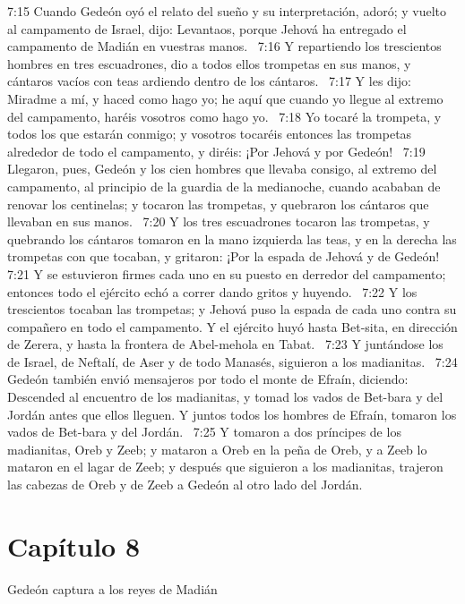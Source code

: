 7:15 Cuando Gedeón oyó el relato del sueño y su interpretación, adoró; y vuelto al campamento de Israel, dijo: Levantaos, porque Jehová ha entregado el campamento de Madián en vuestras manos.  
7:16 Y repartiendo los trescientos hombres en tres escuadrones, dio a todos ellos trompetas en sus manos, y cántaros vacíos con teas ardiendo dentro de los cántaros.  
7:17 Y les dijo: Miradme a mí, y haced como hago yo; he aquí que cuando yo llegue al extremo del campamento, haréis vosotros como hago yo.  
7:18 Yo tocaré la trompeta, y todos los que estarán conmigo; y vosotros tocaréis entonces las trompetas alrededor de todo el campamento, y diréis: ¡Por Jehová y por Gedeón!  
7:19 Llegaron, pues, Gedeón y los cien hombres que llevaba consigo, al extremo del campamento, al principio de la guardia de la medianoche, cuando acababan de renovar los centinelas; y tocaron las trompetas, y quebraron los cántaros que llevaban en sus manos.  
7:20 Y los tres escuadrones tocaron las trompetas, y quebrando los cántaros tomaron en la mano izquierda las teas, y en la derecha las trompetas con que tocaban, y gritaron: ¡Por la espada de Jehová y de Gedeón!  
7:21 Y se estuvieron firmes cada uno en su puesto en derredor del campamento; entonces todo el ejército echó a correr dando gritos y huyendo.  
7:22 Y los trescientos tocaban las trompetas; y Jehová puso la espada de cada uno contra su compañero en todo el campamento. Y el ejército huyó hasta Bet-sita, en dirección de Zerera, y hasta la frontera de Abel-mehola en Tabat.  
7:23 Y juntándose los de Israel, de Neftalí, de Aser y de todo Manasés, siguieron a los madianitas.  
7:24 Gedeón también envió mensajeros por todo el monte de Efraín, diciendo: Descended al encuentro de los madianitas, y tomad los vados de Bet-bara y del Jordán antes que ellos lleguen. Y juntos todos los hombres de Efraín, tomaron los vados de Bet-bara y del Jordán.  
7:25 Y tomaron a dos príncipes de los madianitas, Oreb y Zeeb; y mataron a Oreb en la peña de Oreb, y a Zeeb lo mataron en el lagar de Zeeb; y después que siguieron a los madianitas, trajeron las cabezas de Oreb y de Zeeb a Gedeón al otro lado del Jordán.  
\section*{Capítulo 8 }
Gedeón captura a los reyes de Madián  

